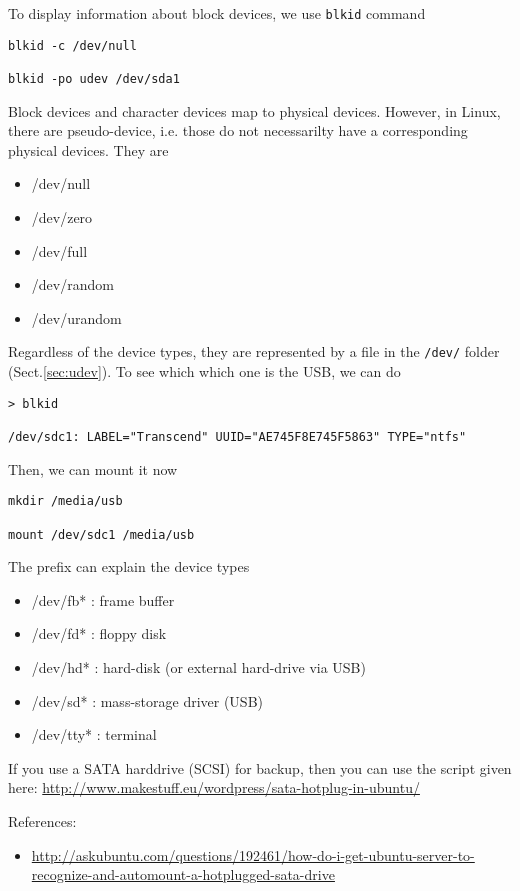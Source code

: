 \begin{framed}
To display information about block devices, we use \verb!blkid! command
\begin{verbatim}
blkid -c /dev/null

blkid -po udev /dev/sda1
\end{verbatim}
\end{framed}

Block devices and character devices map to physical devices. However, in Linux,
there are pseudo-device, i.e. those do not necessarilty have a corresponding
physical devices. They are
\begin{itemize}
  \item /dev/null
  \item /dev/zero
  \item /dev/full
  \item /dev/random
  \item /dev/urandom
\end{itemize}

Regardless of the device types, they are represented by a file in the
\verb!/dev/! folder (Sect.\ref{sec:udev}). To see which which one is the USB, we
can do
{\tiny
\begin{verbatim}
> blkid

/dev/sdc1: LABEL="Transcend" UUID="AE745F8E745F5863" TYPE="ntfs"
\end{verbatim}
}
Then, we can mount it now
\begin{verbatim}
mkdir /media/usb

mount /dev/sdc1 /media/usb
\end{verbatim}

The prefix can explain the device types
\begin{itemize}
  \item /dev/fb* : frame buffer
  \item /dev/fd* : floppy disk
  \item /dev/hd* : hard-disk (or external hard-drive via USB)
  \item /dev/sd* : mass-storage driver (USB)
  \item /dev/tty* : terminal
\end{itemize}

If you use a SATA harddrive (SCSI) for backup, then you can use the script given
here:
\url{http://www.makestuff.eu/wordpress/sata-hotplug-in-ubuntu/}

References:
\begin{itemize}
  \item
  \url{http://askubuntu.com/questions/192461/how-do-i-get-ubuntu-server-to-recognize-and-automount-a-hotplugged-sata-drive}
\end{itemize}

